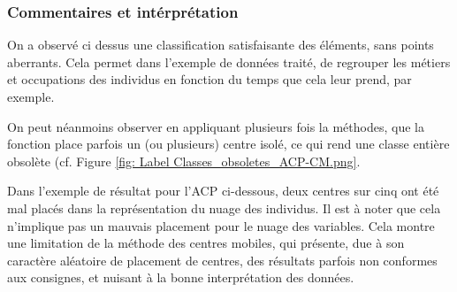 \subsubsection{Commentaires et intérprétation}


On a observé ci dessus une classification satisfaisante des éléments, sans points aberrants. Cela permet dans l'exemple de données traité, de regrouper les métiers et occupations des individus en fonction du temps que cela leur prend, par exemple.

On peut néanmoins observer en appliquant plusieurs fois la méthodes, que la fonction place parfois un (ou plusieurs) centre isolé, ce qui rend une classe entière obsolète (cf. Figure \ref{fig: Label Classes_obsoletes_ACP-CM.png}.


Dans l'exemple de résultat pour l'ACP ci-dessous, deux centres sur cinq ont été mal placés dans la représentation du nuage des individus. Il est à noter que cela n'implique pas un mauvais placement pour le nuage des variables. Cela montre une limitation de la méthode des centres mobiles, qui présente, due à son caractère aléatoire de placement de centres, des résultats parfois non conformes aux consignes, et nuisant à la bonne interprétation des données.
